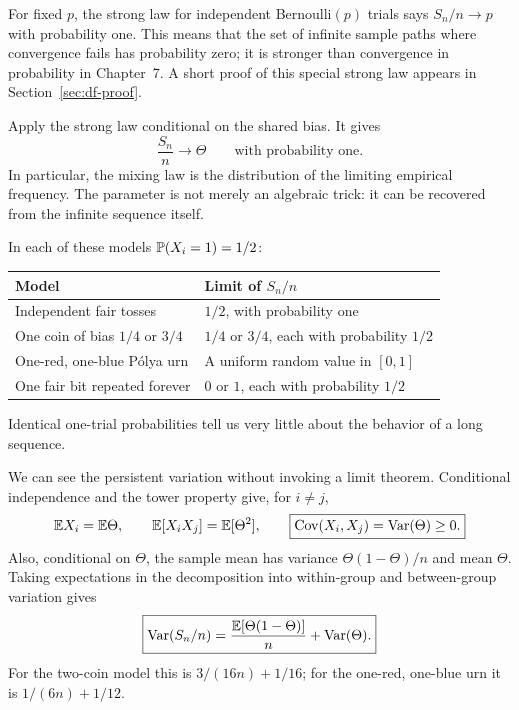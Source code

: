 For fixed $p$, the strong law for independent Bernoulli$(p)$ trials says $S_n/n\to p$ with probability one. This means that the set of infinite sample paths where convergence fails has probability zero; it is stronger than convergence in probability in Chapter~7. A short proof of this special strong law appears in Section~\ref{sec:df-proof}.

Apply the strong law conditional on the shared bias. It gives
\begin{equation}\label{eq:df-limit}
\frac{S_n}{n}\longrightarrow\Theta\qquad\text{with probability one}.
\end{equation}
In particular, the mixing law is the distribution of the limiting empirical frequency. The parameter is not merely an algebraic trick: it can be recovered from the infinite sequence itself.

\begin{example}
In each of these models $\P(X_i=1)=1/2$:
\begin{center}
\small
\begin{tabularx}{.98\linewidth}{lX}
\toprule
Model & Limit of $S_n/n$ \\
\midrule
Independent fair tosses & $1/2$, with probability one \\
One coin of bias $1/4$ or $3/4$ & $1/4$ or $3/4$, each with probability $1/2$ \\
One-red, one-blue P\'olya urn & A uniform random value in $[0,1]$ \\
One fair bit repeated forever & $0$ or $1$, each with probability $1/2$ \\
\bottomrule
\end{tabularx}
\end{center}
Identical one-trial probabilities tell us very little about the behavior of a long sequence.
\end{example}

We can see the persistent variation without invoking a limit theorem. Conditional independence and the tower property give, for $i\ne j$,
\[
\E X_i=\E\Theta,\qquad
\E[X_iX_j]=\E[\Theta^2],\qquad
\boxed{\Cov(X_i,X_j)=\Var(\Theta)\ge0.}
\]
Also, conditional on $\Theta$, the sample mean has variance $\Theta(1-\Theta)/n$ and mean $\Theta$. Taking expectations in the decomposition into within-group and between-group variation gives
\begin{equation}\label{eq:df-variance}
\boxed{\Var(S_n/n)=\frac{\E[\Theta(1-\Theta)]}{n}+\Var(\Theta).}
\end{equation}
For the two-coin model this is $3/(16n)+1/16$; for the one-red, one-blue urn it is $1/(6n)+1/12$.

